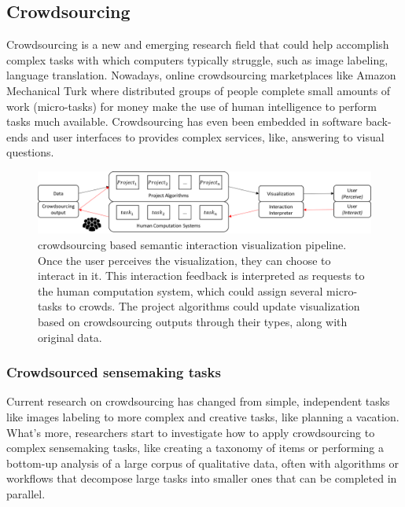 \documentclass[journal]{vgtc}                %
\begin{document}
\subsection{Crowdsourcing}

Crowdsourcing\cite{Law:2011cq} is a new and emerging research field that could help accomplish complex tasks with which computers typically struggle, such as image labeling, language translation\cite{zaidan2011crowdsourcing}.
Nowadays, online crowdsourcing marketplaces like Amazon Mechanical Turk\cite{MTurk} where distributed groups of people complete small amounts of work (micro-tasks) for money make the use of human intelligence to perform tasks much available. Crowdsourcing has even been embedded in software back-ends and user interfaces to provides complex services, like, answering to visual questions\cite{Bigham:2010cj}.


\begin{figure}[!htbp]
 \centering %
  \includegraphics[width=\textwidth]{Pipeline}
 \caption{crowdsourcing based semantic interaction visualization pipeline.
 Once the user perceives the visualization, they can choose to interact in it.
 This interaction feedback is interpreted as requests to the human computation system, which could assign several micro-tasks to crowds.
 The project algorithms could update visualization based on crowdsourcing outputs through their types, along with original data.
	 }
 \label{fig:Pipeline}
\end{figure}

\subsubsection{Crowdsourced sensemaking tasks}
Current research on crowdsourcing has changed from simple, independent tasks like images labeling\cite{welinder2010online} to more complex and creative tasks, like planning a vacation\cite{Zhang2012}. What's more, researchers start to investigate how to apply crowdsourcing to complex sensemaking tasks, like creating a taxonomy of items or performing a bottom-up analysis of a large corpus of qualitative data, often with algorithms or workflows that decompose large tasks into smaller ones that can be completed in parallel.
\end{document}
